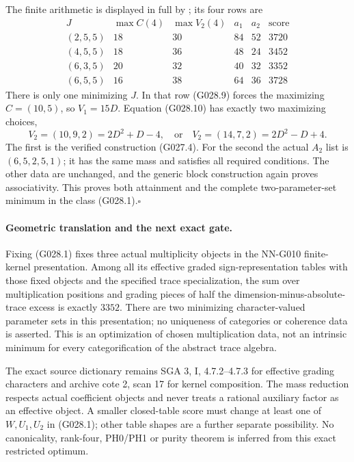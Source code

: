 The finite arithmetic is displayed in full by
; its four
rows are
\[
\begin{array}{c|c|c|c|c|r}
 J&\max C(4)&\max V_2(4)&a_1&a_2&\text{score}\\\hline
 (2,5,5)&18&30&84&52&3720\\
 (4,5,5)&18&36&48&24&3452\\
 (6,3,5)&20&32&40&32&3352\\
 (6,5,5)&16&38&64&36&3728
\end{array}                                                         \tag{G028.11}
\]
There is only one minimizing $J$. In that row (G028.9)
forces the maximizing $C=(10,5)$, so $V_1=15D$.
Equation (G028.10) has exactly two maximizing choices,
\[
 V_2=(10,9,2)=2D^2+D-4,
 \quad\text{or}\quad
 V_2=(14,7,2)=2D^2-D+4.
\]
The first is the verified construction (G027.4).
For the second the actual $A_2$ list is
$(6,5,2,5,1)$; it has the same mass and satisfies
all required conditions. The other data are unchanged,
and the generic block construction again proves
associativity. This proves both attainment and the
complete two-parameter-set minimum in the class
(G028.1).\hfill$\square$

\paragraph{Geometric translation and the next exact gate.}
Fixing (G028.1) fixes three actual multiplicity objects
in the NN-G010 finite-kernel presentation. Among all
its effective graded sign-representation tables with
those fixed objects and the specified trace specialization,
the sum over multiplication positions and grading pieces
of half the dimension-minus-absolute-trace excess is
exactly $3352$. There are two minimizing character-valued
parameter sets in this presentation; no uniqueness of
categories or coherence data is asserted. This is an
optimization of chosen multiplication data, not an
intrinsic minimum for every categorification of the
abstract trace algebra.

The exact source dictionary remains SGA 3, I,
4.7.2--4.7.3 for effective grading characters and
archive cote 2, scan 17 for kernel composition.
The mass reduction respects actual coefficient
objects and never treats a rational auxiliary factor
as an effective object. A smaller closed-table score
must change at least one of $W,U_1,U_2$ in (G028.1);
other table shapes are a further separate possibility.
No canonicality, rank-four, PH0/PH1 or purity theorem
is inferred from this exact restricted optimum.



